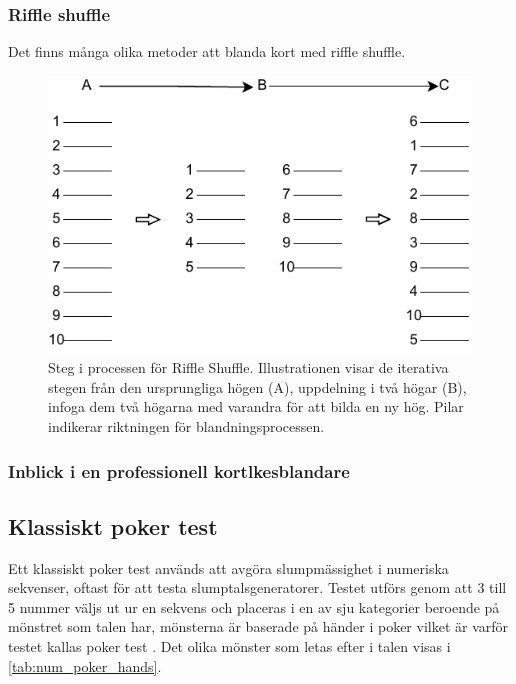 \documentclass[swedish,a4paper]{article}
\begin{document}
\subsubsection{Riffle shuffle}
Det finns många olika metoder att blanda kort med riffle shuffle.


\begin{figure}[H]
	\begin{center}
		\includegraphics{images/rifflle-shuffle.pdf}
	\end{center}
	\captionsetup{justification=centering,margin=2cm}
	\caption{Steg i processen för Riffle Shuffle. Illustrationen visar de
	iterativa stegen från den ursprungliga högen (A), uppdelning i två
	högar (B), infoga dem två högarna med varandra för att bilda en ny hög.
        Pilar indikerar riktningen för blandningsprocessen.}
	\label{fig:riffle_shuffle_1}
\end{figure}

\subsubsection{Inblick i en professionell kortlkesblandare}


\subsection{Klassiskt poker test}
\label{sec:poker_test}
Ett klassiskt poker test används att avgöra slump\-mässighet i numeriska 
sekvenser, oftast för att testa slumptalsgeneratorer. Testet utförs genom
att 3 till 5 nummer väljs ut ur en sekvens och placeras i en av sju  kategorier beroende på mönstret som talen har, mönsterna är baserade på händer i poker vilket är varför testet kallas poker test \parencite{Abdel2014}. 
Det olika mönster som letas efter i talen visas i \cref{tab:num_poker_hands}.
\end{document}

